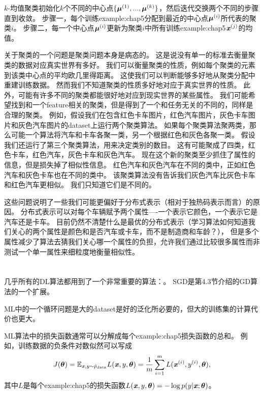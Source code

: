 $k$-均值聚类初始化$k$个不同的中心点$\{\boldsymbol{\mu}^{(1)},...,\boldsymbol{\mu}^{(k)}\}$，然后迭代交换两个不同的步骤直到收敛。
步骤一，每个训练\gls{example:chap5}分配到最近的中心点$\boldsymbol{\mu}^{(i)}$所代表的聚类$i$。
步骤二，每一个中心点$\boldsymbol{\mu}^{(i)}$更新为聚类$i$中所有训练\gls{example:chap5}$\boldsymbol{\mathit{x}}^{(j)}$的均值。

关于聚类的一个问题是聚类问题本身是病态的。
这是说没有单一的标准去衡量聚类的数据对应真实世界有多好。
我们可以衡量聚类的性质，例如每个聚类的元素到该类中心点的平均欧几里得距离。
这使我们可以判断能够多好地从聚类分配中重建训练数据。
然而我们不知道聚类的性质多好地对应于真实世界的性质。
此外，可能有许多不同的聚类都能很好地对应到现实世界的某些属性。
我们可能希望找到和一个\gls{feature}相关的聚类，但是得到了一个和任务无关的不同的，同样是合理的聚类。
例如，假设我们在包含红色卡车图片，红色汽车图片，灰色卡车图片和灰色汽车图片的\gls{dataset}上运行两个聚类算法。
如果每个聚类算法聚两类，那么可能一个算法将汽车和卡车各聚一类，另一个根据红色和灰色各聚一类。
假设我们还运行了第三个聚类算法，用来决定类别的数目。
这有可能聚成了四类，红色卡车，红色汽车，灰色卡车和灰色汽车。
现在这个新的聚类至少抓住了属性的信息，但是损失掉了相似性信息。
红色汽车和灰色汽车在不同的类中，正如红色汽车和灰色卡车也在不同的类中。
该聚类算法没有告诉我们灰色汽车比灰色卡车和红色汽车更相似。
我们只知道它们是不同的。


这些问题说明了一些我们可能更偏好于分布式表示（相对于独热码表示而言）的原因。
分布式表示可以对每个车辆赋予两个属性----一个表示它颜色，一个表示它是汽车还是卡车。
目前仍然不清楚什么是最优的分布式表示（学习算法如何知道我们关心的两个属性是颜色和是否汽车或卡车，而不是制造商和车龄？），
但是多个属性减少了算法去猜我们关心哪一个属性的负担，允许我们通过比较很多属性而非测试一个单一属性来细粒度地衡量相似性。

\section{}
\label{sec:stochastic_gradient_descent_chap5}
几乎所有的\gls{DL}算法都用到了一个非常重要的算法：。
\gls{SGD}是第4.3节介绍的\gls{GD}算法的一个扩展。

\gls{ML}中的一个循环问题是大的\gls{dataset}是好的泛化所必要的，但大的训练集的计算代价也更大。


\gls{ML}算法中的损失函数通常可以分解成每个\gls{example:chap5}损失函数的总和。
例如，训练数据的负条件对数似然可以写成
\begin{equation}
    J(\boldsymbol{\theta}) = \mathbb{E}_{\boldsymbol{\mathit{x}},y \sim \hat{p}_{\text{data}}}
    L(\boldsymbol{\mathit{x}}, y, \boldsymbol{\theta}) = 
    \frac{1}{m} \sum_{i=1}^m  L(\boldsymbol{\mathit{x}}^{(i)}, y^{(i)}, \boldsymbol{\theta}) ,
\end{equation}
其中$L$是每个\gls{example:chap5}的损失函数$L(\boldsymbol{\mathit{x}}, y, \boldsymbol{\theta}) = -\log p(y|\boldsymbol{\mathit{x}};\boldsymbol{\theta})$。

